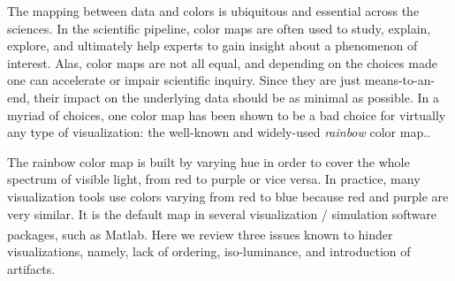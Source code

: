 The mapping between data and colors is ubiquitous and essential across the sciences. 
%
In the scientific pipeline, color maps are often used to study, explain, explore, and ultimately help 
experts to gain insight about a phenomenon of interest. 
% 
Alas, color maps are not all equal, and depending on the choices made one can accelerate or 
impair scientific inquiry. 
%
Since they are just means-to-an-end, their impact on the underlying data should be as minimal as possible.
%
In a myriad of choices, one color map has been shown to be a bad choice for virtually any type of 
visualization: the well-known and widely-used \emph{rainbow} color map.\cite{Borland:2007:RCM:1251554.1251614, 
macdonald1999using, Silva2011320}. 

The rainbow color map is built by varying hue in order to cover the whole spectrum of visible light, 
from red to purple or vice versa. In practice, many visualization tools use colors varying from red to blue because red and purple are very similar.
%
It is the default map in several visualization / simulation software packages, such as Matlab\textsuperscript{\textregistered}.  
%
Here we review three issues known to hinder visualizations, namely, lack of ordering, iso-luminance, 
and introduction of artifacts. 
%
